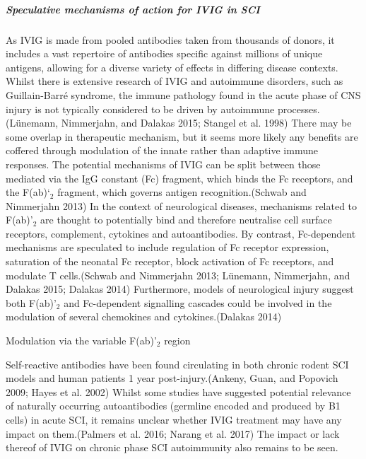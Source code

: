 \documentclass[9pt,lineno]{elife}
\begin{document}
\hypertarget{speculative-mechanisms-of-action-for-ivig-in-sci}{%
\subparagraph{Speculative mechanisms of action for IVIG in SCI}\label{speculative-mechanisms-of-action-for-ivig-in-sci}}

As IVIG is made from pooled antibodies taken from thousands of donors, it includes a vast repertoire of antibodies specific against millions of unique antigens, allowing for a diverse variety of effects in differing disease contexts.
Whilst there is extensive research of IVIG and autoimmune disorders, such as Guillain-Barré syndrome, the immune pathology found in the acute phase of CNS injury is not typically considered to be driven by autoimmune processes.(Lünemann, Nimmerjahn, and Dalakas 2015; Stangel et al. 1998)
There may be some overlap in therapeutic mechanism, but it seems more likely any benefits are coffered through modulation of the innate rather than adaptive immune responses.
The potential mechanisms of IVIG can be split between those mediated via the IgG constant (Fc) fragment, which binds the Fc receptors, and the F(ab)`\(_2\) fragment, which governs antigen recognition.(Schwab and Nimmerjahn 2013)
In the context of neurological diseases, mechanisms related to F(ab)'\(_2\) are thought to potentially bind and therefore neutralise cell surface receptors, complement, cytokines and autoantibodies.
By contrast, Fc-dependent mechanisms are speculated to include regulation of Fc receptor expression, saturation of the neonatal Fc receptor, block activation of Fc receptors, and modulate T cells.(Schwab and Nimmerjahn 2013; Lünemann, Nimmerjahn, and Dalakas 2015; Dalakas 2014)
Furthermore, models of neurological injury suggest both F(ab)'\(_2\) and Fc-dependent signalling cascades could be involved in the modulation of several chemokines and cytokines.(Dalakas 2014)

Modulation via the variable F(ab)'\(_2\) region

Self-reactive antibodies have been found circulating in both chronic rodent SCI models and human patients 1 year post-injury.(Ankeny, Guan, and Popovich 2009; Hayes et al. 2002)
Whilst some studies have suggested potential relevance of naturally occurring autoantibodies (germline encoded and produced by B1 cells) in acute SCI, it remains unclear whether IVIG treatment may have any impact on them.(Palmers et al. 2016; Narang et al. 2017)
The impact or lack thereof of IVIG on chronic phase SCI autoimmunity also remains to be seen.
\end{document}
